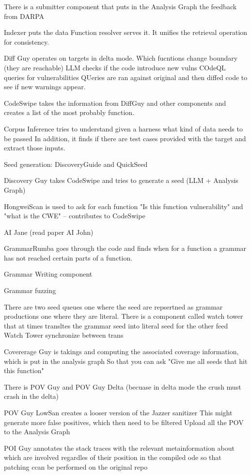 There is a submitter component that puts in the Analysis Graph the feedback from DARPA

Indexer puts the data Function resolver serves it.
It unifies the retrieval operation for consistency.

Diff Guy operates on targets in delta mode.
Which fucntions change boundary (they are reachable)
LLM checks if the code introduce new vulns
COdeQL queries for vulnerabilities
QUeries are ran against original and then diffed code to see if new warnings appear.

CodeSwipe takes the information from DiffGuy and other components and creates a list of the most probably function.

Corpus Inference tries to understand given a harness what kind of data needs to be passed
In addition, it finds if there are test cases provided with the target and extract those inputs.

Seed generation: DiscoveryGuide and QuickSeed

Discovery Guy takes CodeSwipe and tries to generate a seed (LLM + Analysis Graph)

HongweiScan is used to ask for each function "Is this function vulnerability" and "what is the CWE" -- contributes to CodeSwipe


AI Jane (read paper AI John) 

GrammarRumba goes through the code and finds when for a function a grammar has not reached certain parts of a function.


Grammar Writing component 

Grammar fuzzing 

There are two seed queues one where the seed are repsertned as grammar productions one where they are literal.
There is a component called watch tower that at times transltes the grammar seed into literal seed for the other feed
Watch Tower synchronize between trans

Covererage Guy is takings and computing the associated coverage information, which is put in the analysis graph
So that you can ask "Give me all seeds that hit this function"

There is POV Guy and POV Guy Delta (becuase in delta mode the crush must crash in the delta)

POV Guy LowSan creates a looser version of the Jazzer sanitizer 
This might generate more false positives, which then need to be filtered
Upload all the POV to the Analysis Graph 

POI Guy annotates the stack traces with the relevant metainformation about which are involved regardles of their position in the compiled ode so that patching ccan be performed on the original repo

